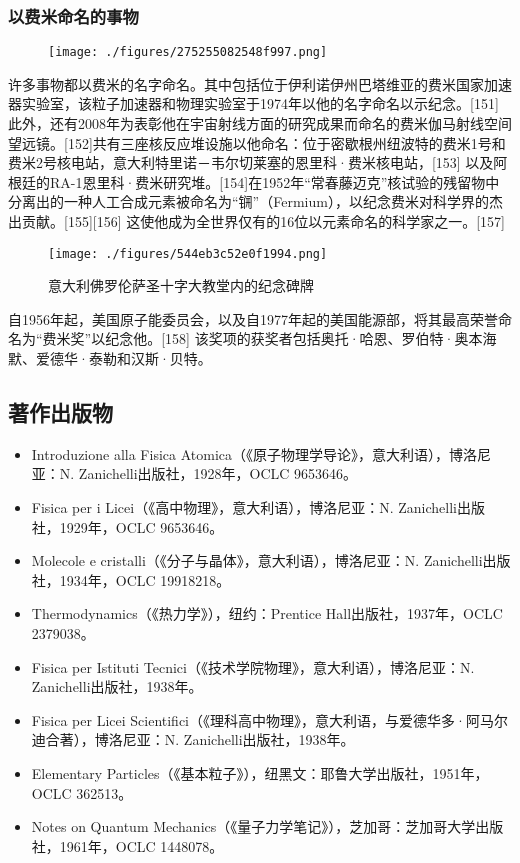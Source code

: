 \subsubsection{以费米命名的事物}
\begin{figure}[ht]
\centering
\texttt{[image: ./figures/275255082548f997.png]}
\caption{} \label{fig_ELK_14}
\end{figure}
许多事物都以费米的名字命名。其中包括位于伊利诺伊州巴塔维亚的费米国家加速器实验室，该粒子加速器和物理实验室于1974年以他的名字命名以示纪念。[151] 此外，还有2008年为表彰他在宇宙射线方面的研究成果而命名的费米伽马射线空间望远镜。[152]共有三座核反应堆设施以他命名：位于密歇根州纽波特的费米1号和费米2号核电站，意大利特里诺－韦尔切莱塞的恩里科·费米核电站，[153] 以及阿根廷的RA-1恩里科·费米研究堆。[154]在1952年“常春藤迈克”核试验的残留物中分离出的一种人工合成元素被命名为“锎”（Fermium），以纪念费米对科学界的杰出贡献。[155][156] 这使他成为全世界仅有的16位以元素命名的科学家之一。[157]
\begin{figure}[ht]
\centering
\texttt{[image: ./figures/544eb3c52e0f1994.png]}
\caption{意大利佛罗伦萨圣十字大教堂内的纪念碑牌} \label{fig_ELK_15}
\end{figure}
自1956年起，美国原子能委员会，以及自1977年起的美国能源部，将其最高荣誉命名为“费米奖”以纪念他。[158] 该奖项的获奖者包括奥托·哈恩、罗伯特·奥本海默、爱德华·泰勒和汉斯·贝特。
\subsection{著作出版物}
\begin{itemize}
\item Introduzione alla Fisica Atomica（《原子物理学导论》，意大利语），博洛尼亚：N. Zanichelli出版社，1928年，OCLC 9653646。
\item Fisica per i Licei（《高中物理》，意大利语），博洛尼亚：N. Zanichelli出版社，1929年，OCLC 9653646。
\item Molecole e cristalli（《分子与晶体》，意大利语），博洛尼亚：N. Zanichelli出版社，1934年，OCLC 19918218。
\item Thermodynamics（《热力学》），纽约：Prentice Hall出版社，1937年，OCLC 2379038。
\item Fisica per Istituti Tecnici（《技术学院物理》，意大利语），博洛尼亚：N. Zanichelli出版社，1938年。
\item Fisica per Licei Scientifici（《理科高中物理》，意大利语，与爱德华多·阿马尔迪合著），博洛尼亚：N. Zanichelli出版社，1938年。
\item Elementary Particles（《基本粒子》），纽黑文：耶鲁大学出版社，1951年，OCLC 362513。
\item Notes on Quantum Mechanics（《量子力学笔记》），芝加哥：芝加哥大学出版社，1961年，OCLC 1448078。
\end{itemize}
